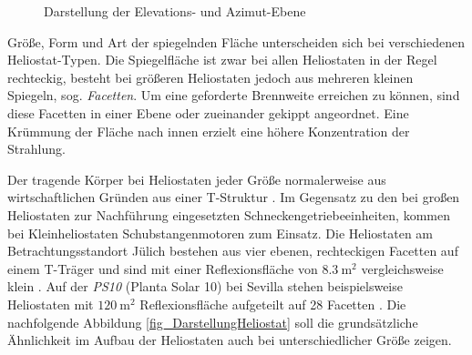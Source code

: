 \begin{figure}[h!]
    \centering
    \setlength{\fboxsep}{1pt}
    \setlength{\fboxrule}{1pt}
\caption[Darstellung der Elevations- und Azimut-Ebene]{Darstellung der Elevations- und Azimut-Ebene \cite[S.6]{DissZanger}}
    \label{fig_FreiheitsgradeHeliostat}
\end{figure}

Größe, Form und Art der spiegelnden Fläche unterscheiden sich bei verschiedenen Heliostat-Typen.
Die Spiegelfläche ist zwar bei allen Heliostaten in der Regel rechteckig, besteht bei größeren Heliostaten jedoch aus mehreren kleinen Spiegeln, sog. \textit{Facetten}.
Um eine geforderte Brennweite erreichen zu können, sind diese Facetten in einer Ebene oder zueinander gekippt angeordnet.
Eine Krümmung der Fläche nach innen erzielt eine höhere Konzentration der Strahlung. \cite[S.5]{DissZanger}

Der tragende Körper bei Heliostaten jeder Größe normalerweise aus wirtschaftlichen Gründen aus einer T-Struktur \cite[S.97]{ScottAJones}.
Im Gegensatz zu den bei großen Heliostaten zur Nachführung eingesetzten Schneckengetriebeeinheiten, kommen bei Kleinheliostaten Schubstangenmotoren zum Einsatz.
Die Heliostaten am Betrachtungsstandort Jülich bestehen aus vier ebenen, rechteckigen Facetten auf einem T-Träger und sind mit einer Reflexionsfläche von $\SI{8.3}{\metre\squared}$ vergleichsweise klein \cite[S.4]{DissGall}\cite[S.13]{DissBelhomme}.
Auf der \textit{PS10} (Planta Solar 10) bei Sevilla stehen beispielsweise Heliostaten mit $\SI{120}{\metre\squared}$ Reflexionsfläche aufgeteilt auf 28 Facetten \cite[S.5]{ManuelSilva}.
Die nachfolgende Abbildung \ref{fig_DarstellungHeliostat} soll die grundsätzliche Ähnlichkeit im Aufbau der Heliostaten auch bei unterschiedlicher Größe zeigen.


